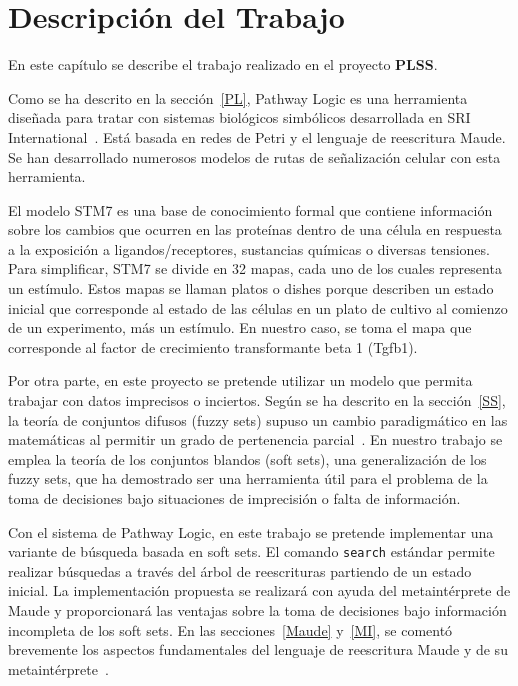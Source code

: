 
\chapter{Descripción del Trabajo}
\label{cap:descripcionTrabajo}

En este capítulo se describe el trabajo realizado en el proyecto \textbf{PLSS}.
\smallskip

Como se ha descrito en la sección~\ref{PL}, Pathway Logic es una herramienta diseñada para tratar con sistemas biológicos simbólicos desarrollada en SRI International~\citep{sfm/Talcott08}. Está basada en redes de Petri y el lenguaje de reescritura Maude. Se han desarrollado numerosos modelos de rutas de señalización celular con esta herramienta. 
\smallskip

El modelo STM7 es una base de conocimiento formal que contiene información sobre los cambios que ocurren en las proteínas dentro de una célula en respuesta a la exposición a ligandos/receptores, sustancias químicas o diversas tensiones. 
Para simplificar, STM7 se divide en 32 mapas, cada uno de los cuales representa un estímulo.
Estos mapas se llaman platos o dishes porque describen un estado inicial que corresponde al estado de las células en un plato de cultivo al comienzo de un experimento, más un estímulo.
En nuestro caso, se toma el mapa que corresponde al factor de crecimiento transformante beta 1 (Tgfb1).
\medskip


Por otra parte, en este proyecto se pretende utilizar un modelo que permita trabajar con datos imprecisos o inciertos.
Según se ha descrito en la sección~\ref{SS}, la teoría de conjuntos difusos (fuzzy sets) supuso un cambio paradigmático en las matemáticas al permitir un grado de pertenencia parcial~\citep{Zadeh}. 
En nuestro trabajo se emplea la teoría de los conjuntos blandos (soft sets), una generalización de los fuzzy sets, que ha demostrado ser una herramienta útil para el problema de la toma de decisiones bajo situaciones de imprecisión o falta de información.
\medskip


Con el sistema de Pathway Logic, en este trabajo se pretende implementar una variante de búsqueda basada en soft sets. El comando \texttt{search} estándar permite realizar búsquedas a través del árbol de reescrituras partiendo de un estado inicial. La implementación propuesta se realizará con ayuda del metaintérprete de Maude y proporcionará las ventajas sobre la toma de decisiones bajo información incompleta de los soft sets. 
En las secciones~\ref{Maude} y~\ref{MI}, se comentó brevemente los aspectos fundamentales del lenguaje de reescritura Maude y de su metaintérprete~\citep{maude30}.
\bigskip


